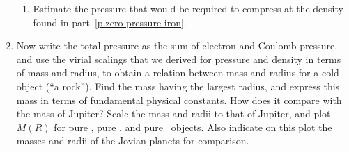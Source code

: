 \begin{enumerate}
\begin{enumerate}
\item Estimate the pressure that would be required to compress \iron[56] at the density found in part~\ref{p.zero-pressure-iron}.
\end{enumerate}

\item Now write the total pressure as the sum of electron and Coulomb pressure, and use the virial scalings that we derived for pressure and density in terms of mass and radius, to obtain a relation between mass and radius for a cold object (``a rock'').  Find the mass having the largest radius, and express this mass in terms of fundamental physical constants.  How does it compare with the mass of Jupiter?  Scale the mass and radii to that of Jupiter, and plot $M(R)$ for pure \hydrogen, pure \helium, and pure \carbon\ objects.  Also indicate on this plot the masses and radii of the Jovian planets for comparison.

\end{enumerate}
